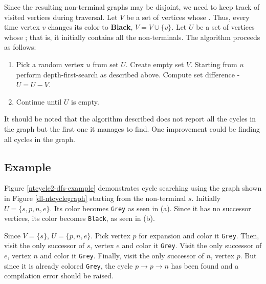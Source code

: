 Since the resulting non-terminal graphs may be disjoint, we need to keep track of visited vertices during traversal. Let $V$ be a set of vertices whose . Thus, every time vertex $v$ changes its color to \textbf{Black}, $V = V \cup \{v\} $. Let $U$ be a set of vertices whose ; that is, it initially contains all the non-terminals. The algorithm proceeds as follows:

\begin{enumerate}
\item
Pick a random vertex $u$ from set $U$. Create empty set $V$. Starting from $u$ perform depth-first-search as described above. Compute set difference - $U = U-V$.
\item
Continue until $U$ is empty.
\end{enumerate}

It should be noted that the algorithm described does not report all the cycles in the graph but the first one it manages to find. One improvement could be finding all cycles in the graph.

\subsection{Example}

Figure \ref{ntcycle2-dfs-example} demonstrates cycle searching using the graph shown in Figure \ref{dl-ntcyclegraph} starting from the non-terminal $s$. Initially $U=\{s,p,n,e\}$. Its color becomes \texttt{Grey} as seen in (a). Since it has no successor vertices, its color becomes \texttt{Black}, as seen in (b).

Since $V = \{ s \}$, $U=\{p,n,e\}$. Pick vertex $p$ for expansion and color it \texttt{Grey}. Then, visit the only successor of $s$, vertex $e$ and color it \texttt{Grey}. Visit the only successor of $e$, vertex $n$ and color it \texttt{Grey}. Finally, visit the only successor of $n$, vertex $p$. But since it is already colored \texttt{Grey}, the cycle  $p \rightarrow p \rightarrow n$ has been found and a compilation error should be raised.


